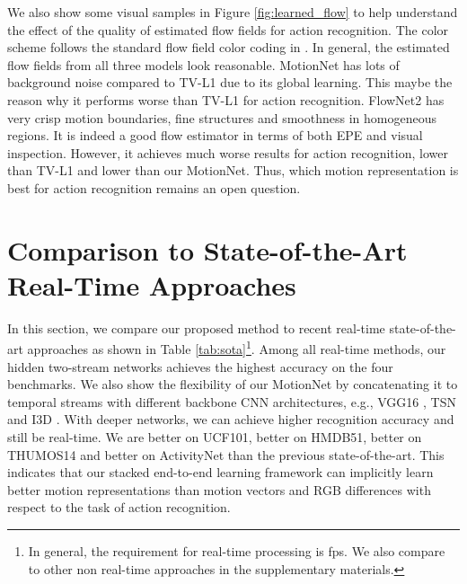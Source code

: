 \documentclass[runningheads]{llncs}
\begin{document}
		We also show some visual samples in Figure \ref{fig:learned_flow} to help understand the effect of the quality of estimated flow fields for action recognition. The color scheme follows the standard flow field color coding in \cite{flownet2}. In general, the estimated flow fields from all three models look reasonable. 
		MotionNet has lots of background noise compared to TV-L1 due to its global learning. This maybe the reason why it performs worse than TV-L1 for action recognition. FlowNet2 has very crisp motion boundaries, fine structures and smoothness in homogeneous regions. It is indeed a good flow estimator in terms of both EPE and visual inspection. However, it achieves much worse results for action recognition,  lower than TV-L1 and  lower than our MotionNet. Thus, which motion representation is best for action recognition remains an open question. 
		


		
		
		\section{Comparison to State-of-the-Art Real-Time Approaches}
		\label{sec:sota}
		In this section, we compare our proposed method to recent real-time state-of-the-art approaches as shown in Table \ref{tab:sota}\footnote{In general, the requirement for real-time processing is  fps. We also compare to other non real-time approaches in the supplementary materials.}. Among all real-time methods, our hidden two-stream networks achieves the highest accuracy on the {\color{black}four} benchmarks. We also show the flexibility of our MotionNet by concatenating it to temporal streams with different backbone CNN architectures, e.g., VGG16 \cite{wanggoodpractice2015}, TSN \cite{TSN2016} and I3D \cite{I3D_Carreira_cvpr17}. With deeper networks, we can achieve higher recognition accuracy and still be real-time. We are  better on UCF101,  better on HMDB51, {\color{black}  better on THUMOS14 and  better on ActivityNet} than the previous state-of-the-art. This indicates that {\color{black} our stacked end-to-end learning framework can implicitly learn better motion representations than motion vectors \cite{kantorov2014,EMV_cvpr16} and RGB differences \cite{TSN2016} with respect to the task of action recognition.}
		
		
\end{document}
